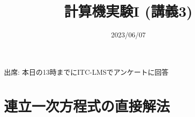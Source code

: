 \documentclass[10pt,dvipdfmx]{beamer}
\title{計算機実験I (講義3)}
\date{2023/06/07}
\begin{document}
\begin{frame}
  \titlepage
  \tableofcontents
  出席: 本日の13時までにITC-LMSでアンケートに回答
\end{frame}





\section{連立一次方程式の直接解法}






% 



















\section{}

\end{document}
